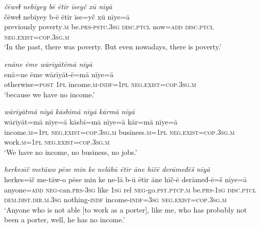 \ea \label{ŽM.56}
\textit{čēweɫ nebīyey bē ētir īseyč xū nīyā} \\ 
\gll čēweɫ nebīyey b-ē ētir īse=yč xū nīye=ā \\ 
 previously poverty\textsc{.m} be\textsc{.prs}\textsc{-pstc}\textsc{.3sg} \textsc{disc.ptcl} now\textsc{=add} \textsc{disc.ptcl} \textsc{\textsc{neg.}exist}\textsc{=cop}\textsc{.3sg}\textsc{.m} \\ 
\glt `In the past, there was poverty. But even nowadays, there is poverty.'
\z 
 
\ea \label{ŽM.59}
\textit{enāne ēme wārīyātēmā nīyā} \\ 
\gll enā=ne ēme wārīyāt-ē=mā nīye=ā \\ 
 otherwise\textsc{=\textsc{post}} \textsc{1pl} income\textsc{.m}\textsc{-indf}\textsc{=\textsc{1pl}} \textsc{\textsc{neg.}exist}\textsc{=cop}\textsc{.3sg}\textsc{.m} \\ 
\glt `because we have no income.'
\z 
 
\ea \label{ŽM.60}
\textit{wārīyātmā nīyā kāsbīmā nīyā kārmā nīyā} \\ 
\gll wārīyāt=mā nīye=ā kāsbī=mā nīye=ā kār=mā nīye=ā \\ 
 income\textsc{.m}\textsc{=\textsc{1pl}} \textsc{\textsc{neg.}exist}\textsc{=cop}\textsc{.3sg}\textsc{.m} business\textsc{.m}\textsc{=\textsc{1pl}} \textsc{\textsc{neg.}exist}\textsc{=cop}\textsc{.3sg}\textsc{.m} work\textsc{.m}\textsc{=\textsc{1pl}} \textsc{\textsc{neg.}exist}\textsc{=cop}\textsc{.3sg}\textsc{.m} \\ 
\glt `We have no income, no business, no jobs.'
\z 
 
\ea \label{ŽM.62}
\textit{herkesīč metāwo pēse min ke nelābū ētir āne hīčē derāmeđēš nīyā} \\ 
\gll herkes=īč me-tāw-o pēse min ke ne-lā b-ū ētir āne hīč-ē derāmeđ-ē=š nīye=ā \\ 
 anyone\textsc{=add} \textsc{neg-}can\textsc{.prs}\textsc{-3sg} like \textsc{1sg} rel \textsc{neg-}go\textsc{.pst}\textsc{.ptcp}\textsc{.m} be\textsc{.prs}\textsc{-\textsc{1sg}} \textsc{disc.ptcl} \textsc{dem.dist}\textsc{.dir}\textsc{.m}\textsc{.3sg} nothing\textsc{-indf} income\textsc{-indf}\textsc{=3sg} \textsc{\textsc{neg.}exist}\textsc{=cop}\textsc{.3sg}\textsc{.m} \\ 
\glt `Anyone who is not able [to work as a porter], like me, who has probably not been a porter, well, he has no income.'
\z 
 
